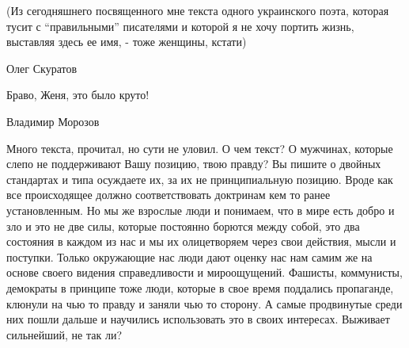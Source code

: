 (Из сегодняшнего посвященного мне текста одного украинского поэта, которая
тусит с \enquote{правильными} писателями и которой я не хочу портить жизнь, выставляя
здесь ее имя, - тоже женщины, кстати)

Олег Скуратов

Браво, Женя, это было круто!

Владимир Морозов

Много текста, прочитал, но сути не уловил. О чем текст? О мужчинах, которые
слепо не поддерживают Вашу позицию, твою правду? Вы пишите о двойных стандартах
и типа осуждаете их, за их не принципиальную позицию. Вроде как все
происходящее должно соответствовать доктринам кем то ранее установленным. Но мы
же взрослые люди и понимаем, что в мире есть добро и зло и это не две силы,
которые постоянно борются между собой, это два состояния в каждом из нас и мы
их олицетворяем через свои действия, мысли и поступки. Только окружающие нас
люди дают оценку нас нам самим же на основе своего видения справедливости и
мироощущений. Фашисты, коммунисты, демократы в принципе тоже люди, которые в
свое время поддались пропаганде, клюнули на чью то правду и заняли чью то
сторону. А самые продвинутые среди них пошли дальше и научились использовать
это в своих интересах. Выживает сильнейший, не так ли?

